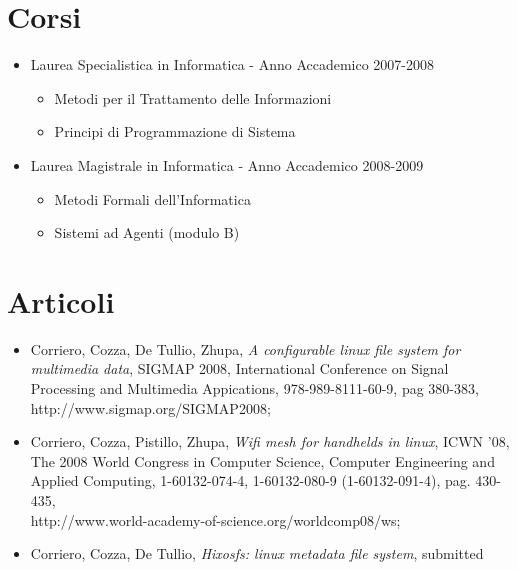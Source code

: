 \documentclass[a4paper,12pt]{article}
\begin{document}
\section*{Corsi}
\begin{itemize}
	\item Laurea Specialistica in Informatica - Anno Accademico 2007-2008
	\begin{itemize}
		\item Metodi per il Trattamento delle Informazioni
		\item Principi di Programmazione di Sistema
	\end{itemize}
	\item Laurea Magistrale in Informatica - Anno Accademico 2008-2009
	\begin{itemize}
		\item Metodi Formali dell'Informatica
		\item Sistemi ad Agenti (modulo B)
	\end{itemize}
\end{itemize}

\section*{Articoli}
\begin{itemize}
\item Corriero, Cozza, De Tullio, Zhupa, \textit{A configurable linux file system for multimedia data}, SIGMAP 2008, International Conference on Signal Processing and Multimedia Appications, 978-989-8111-60-9, pag 380-383, \\http://www.sigmap.org/SIGMAP2008;
\item Corriero, Cozza, Pistillo, Zhupa, \textit{Wifi mesh for handhelds in linux}, ICWN '08, The 2008 World Congress in Computer Science, Computer Engineering and Applied Computing, 1-60132-074-4, 1-60132-080-9 (1-60132-091-4), pag. 430-435,\\http://www.world-academy-of-science.org/worldcomp08/ws;
\item Corriero, Cozza, De Tullio, \textit{Hixosfs: linux metadata file system}, submitted
\end{itemize}
\end{document}
